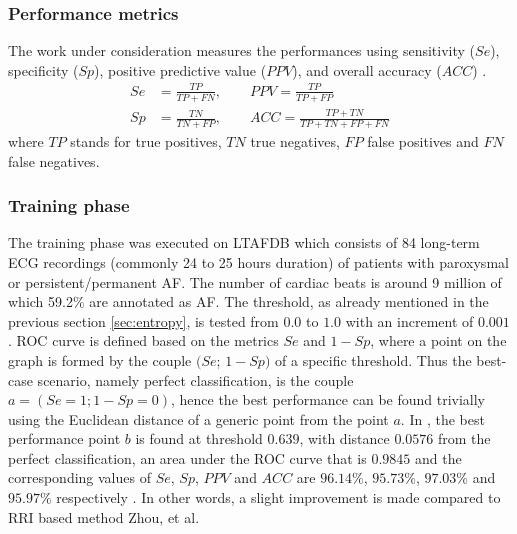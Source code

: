\subsubsection{Performance metrics}
The work under consideration measures the performances using sensitivity ($Se$), specificity ($Sp$), positive predictive value ($PPV$), and overall accuracy ($ACC$) \cite[p. 6]{zhou2015}.
\begin{equation}
\begin{aligned} S e &=\frac{T P}{T P+F N},\qquad P P V=\frac{T P}{T P+F P} \\ S p &=\frac{T N}{T N+F P}, \qquad A C C=\frac{T P+T N}{T P+T N+F P+F N} \end{aligned}
\end{equation}
where $TP$ stands for true positives, $TN$ true negatives, $FP$ false positives and $FN$ false negatives.

\subsubsection{Training phase}
The training phase was executed on LTAFDB which consists of 84 long-term ECG recordings (commonly 24 to 25 hours duration) of patients with paroxysmal or persistent/permanent AF. The number of cardiac beats is around 9 million of which 59.2\% are annotated as AF. The threshold, as already mentioned in the previous section \ref{sec:entropy}, is tested from $0.0$ to $1.0$  with an increment of $0.001$. ROC curve is defined based on the metrics $Se$ and $1-Sp$, where a point on the graph is formed by the couple $(Se$; $1-Sp)$ of a specific threshold. Thus the best-case scenario, namely perfect classification, is the couple $a=(Se=1; 1-Sp=0)$, hence the best performance can be found trivially using the Euclidean distance of a generic point from the point $a$. In , the best performance point $b$ is found at threshold $0.639$, with distance $0.0576$ from the perfect classification, an area under the ROC curve that is $0.9845$ and the corresponding values of $Se$, $Sp$, $PPV$ and $ACC$ are $96.14\%$, $95.73\%$, $97.03\%$ and $95.97\%$ respectively \cite{zhou2015}. In other words, a slight improvement is made compared to RRI based method Zhou, et al\cite{zhou2014}.



